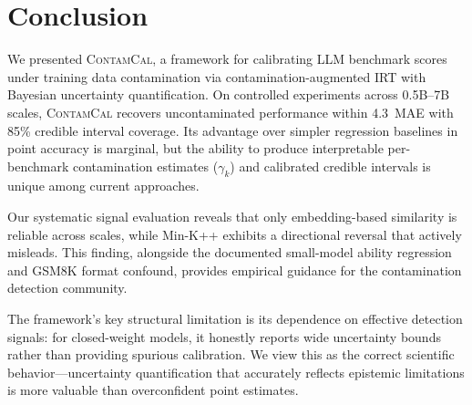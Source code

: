\documentclass[11pt,a4paper]{article}
\newcommand{\method}{\textsc{ContamCal}}
\newcommand{\pp}{\,\text{pp}}
\begin{document}
\section{Conclusion}
\label{sec:conclusion}

We presented \method{}, a framework for calibrating LLM benchmark scores under training data contamination via contamination-augmented IRT with Bayesian uncertainty quantification. On controlled experiments across 0.5B--7B scales, \method{} recovers uncontaminated performance within 4.3\pp{} MAE with 85\% credible interval coverage. Its advantage over simpler regression baselines in point accuracy is marginal, but the ability to produce interpretable per-benchmark contamination estimates ($\gamma_k$) and calibrated credible intervals is unique among current approaches.

Our systematic signal evaluation reveals that only embedding-based similarity is reliable across scales, while Min-K++ exhibits a directional reversal that actively misleads. This finding, alongside the documented small-model ability regression and GSM8K format confound, provides empirical guidance for the contamination detection community.

The framework's key structural limitation is its dependence on effective detection signals: for closed-weight models, it honestly reports wide uncertainty bounds rather than providing spurious calibration. We view this as the correct scientific behavior---uncertainty quantification that accurately reflects epistemic limitations is more valuable than overconfident point estimates.


\end{document}
